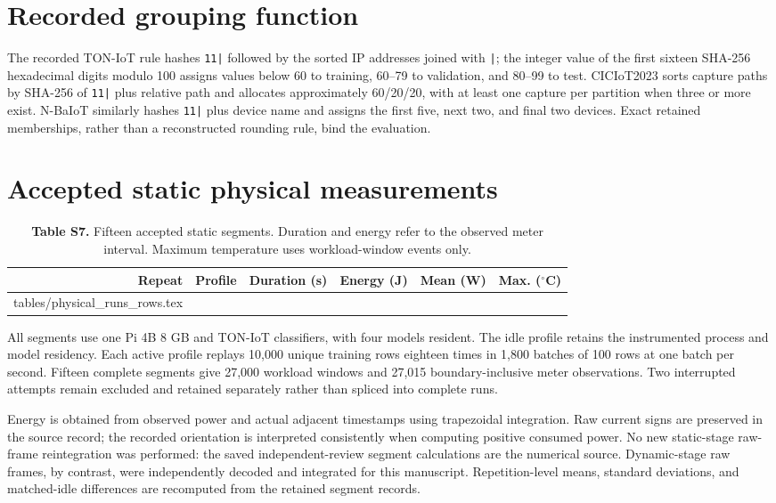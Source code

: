 \documentclass[10pt,a4paper]{article}
\makeatletter
\newcommand{\tableinput}[1]{\@@input #1.tex }
\makeatother
\begin{document}
\section{Recorded grouping function}
The recorded TON-IoT rule hashes \texttt{11|} followed by the sorted IP addresses joined with \texttt{|}; the integer value of the first sixteen SHA-256 hexadecimal digits modulo 100 assigns values below 60 to training, 60--79 to validation, and 80--99 to test. CICIoT2023 sorts capture paths by SHA-256 of \texttt{11|} plus relative path and allocates approximately 60/20/20, with at least one capture per partition when three or more exist. N-BaIoT similarly hashes \texttt{11|} plus device name and assigns the first five, next two, and final two devices. Exact retained memberships, rather than a reconstructed rounding rule, bind the evaluation.


\clearpage
\section{Accepted static physical measurements}
\begin{table}[h!]
\centering\small
\caption*{\textbf{Table S7.} Fifteen accepted static segments. Duration and energy refer to the observed meter interval. Maximum temperature uses workload-window events only.}
\begin{tabular}{rlrrrr}\toprule
Repeat & Profile & Duration (s) & Energy (J) & Mean (W) & Max. ($^\circ$C)\\\midrule
\tableinput{tables/physical_runs_rows}
\bottomrule\end{tabular}
\end{table}
All segments use one Pi 4B 8 GB and TON-IoT classifiers, with four models resident. The idle profile retains the instrumented process and model residency. Each active profile replays 10,000 unique training rows eighteen times in 1,800 batches of 100 rows at one batch per second. Fifteen complete segments give 27,000 workload windows and 27,015 boundary-inclusive meter observations. Two interrupted attempts remain excluded and retained separately rather than spliced into complete runs.

Energy is obtained from observed power and actual adjacent timestamps using trapezoidal integration. Raw current signs are preserved in the source record; the recorded orientation is interpreted consistently when computing positive consumed power. No new static-stage raw-frame reintegration was performed: the saved independent-review segment calculations are the numerical source. Dynamic-stage raw frames, by contrast, were independently decoded and integrated for this manuscript. Repetition-level means, standard deviations, and matched-idle differences are recomputed from the retained segment records.
\end{document}
